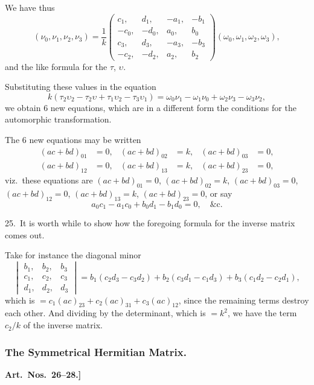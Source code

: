 \documentclass[11pt,a4paper]{article}
\theoremstyle{definition}
\begin{document}
We have thus
\[
(\nu_0, \nu_1, \nu_2, \nu_3) = \frac{1}{k}
\begin{pmatrix}
c_1, & d_1, & -a_1, & -b_1\\
-c_0, & -d_0, & a_0, & b_0\\
c_3, & d_3, & -a_3, & -b_3\\
-c_2, & -d_2, & a_2, & b_2
\end{pmatrix}
(\omega_0, \omega_1, \omega_2, \omega_3),
\]
and the like formula for the $\tau$, $\upsilon$.

Substituting these values in the equation
\[
k(\tau_2\upsilon_2 - \tau_2\upsilon + \tau_1\upsilon_2 - \tau_3\upsilon_1) = \omega_0\nu_1 - \omega_1\nu_0 + \omega_2\nu_3 - \omega_3\nu_2,
\]
we obtain 6 new equations, which are in a different form the conditions for the automorphic transformation.

The 6 new equations may be written
\begin{align*}
(ac + bd)_{01} &= 0, & (ac + bd)_{02} &= k, & (ac + bd)_{03} &= 0,\\
(ac + bd)_{12} &= 0, & (ac + bd)_{13} &= k, & (ac + bd)_{23} &= 0,
\end{align*}
viz.\ these equations are $(ac + bd)_{01} = 0$, $(ac + bd)_{02} = k$, $(ac + bd)_{03} = 0$, $(ac + bd)_{12} = 0$, $(ac + bd)_{13} = k$, $(ac + bd)_{23} = 0$, or say
\[
a_0c_1 - a_1c_0 + b_0d_1 - b_1d_0 = 0, \quad \text{\&c.}
\]

\medskip

25.\ It is worth while to show how the foregoing formula for the inverse matrix comes out.

Take for instance the diagonal minor
\[
\begin{vmatrix}
b_1, & b_2, & b_3\\
c_1, & c_2, & c_3\\
d_1, & d_2, & d_3
\end{vmatrix}
= b_1(c_2d_3 - c_3d_2) + b_2(c_3d_1 - c_1d_3) + b_3(c_1d_2 - c_2d_1),
\]
which is $= c_1(ac)_{23} + c_2(ac)_{31} + c_3(ac)_{12}$, since the remaining terms destroy each other. And dividing by the determinant, which is $= k^2$, we have the term $c_2/k$ of the inverse matrix.

\subsubsection*{The Symmetrical Hermitian Matrix.}

\textbf{Art.~Nos.~26--28.]
}
\end{document}
